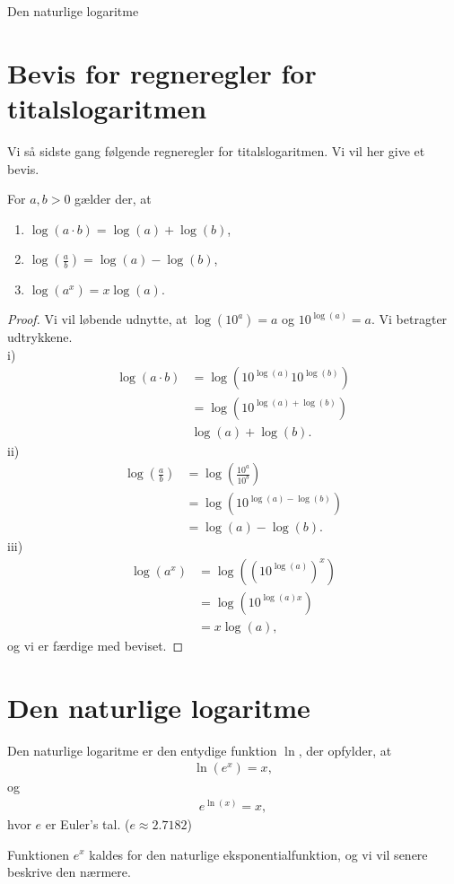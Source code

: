 \begin{center}
\Huge
Den naturlige logaritme
\end{center}

\section*{Bevis for regneregler for titalslogaritmen}
Vi så sidste gang følgende regneregler for titalslogaritmen. Vi vil her give et bevis.
\begin{setn}[Logaritmeregneregler]
	For $a,b>0$ gælder der, at
	\begin{enumerate}[label=\roman*)]
		\item $\log(a\cdot b) = \log(a)+ \log(b)$,
		\item $\log\left(\frac{a}{b}\right) = \log(a)-\log(b)$,
		\item $\log(a^x) = x\log(a).$
	\end{enumerate}		
\end{setn}
\begin{proof}
	Vi vil løbende udnytte, at $\log(10^a) = a$ og $10^{\log(a)} = a$. Vi betragter udtrykkene.
	\\
	i)
	\begin{align*}
		\log(a\cdot b) &= \log(10^{\log(a)}10^{\log(b)}) \\
		&= \log(10^{\log(a)+\log(b)})\\
		&\log(a) + \log(b).
	\end{align*}
	ii)
	\begin{align*}
		\log\left(\frac{a}{b}\right) &= \log\left(\frac{10^a}{10^b}\right)\\
		&= \log(10^{\log(a)-\log(b)})\\
		&= \log(a)-\log(b).
	\end{align*}
	iii)
	\begin{align*}
		\log(a^x) &= \log\left( \left(10^{\log(a)}\right)^x\right)\\
		&= \log\left(10^{\log(a)x}\right)\\
		&= x\log(a),
    \end{align*}		
    og vi er færdige med beviset. 
\end{proof}
\section*{Den naturlige logaritme}
\begin{defn}
Den naturlige logaritme er den entydige funktion $\ln$, der opfylder, at
\begin{align*}
\ln(e^x) = x, 
\end{align*}
og
\begin{align*}
e^{\ln(x)} = x,
\end{align*}
hvor $e$ er Euler's tal. ($e \approx 2.7182$)
\end{defn}
Funktionen $e^x$ kaldes for den naturlige eksponentialfunktion, og vi vil senere beskrive den nærmere.

